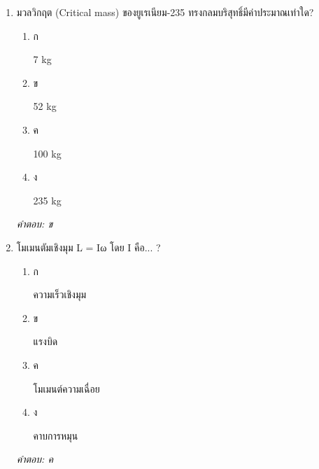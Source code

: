 \documentclass[12pt]{article}
\begin{document}
\begin{enumerate}[label=\arabic*., itemsep=0.5\baselineskip, topsep=0.5\baselineskip, leftmargin=*]
\item มวลวิกฤต (Critical mass) ของยูเรเนียม-235 ทรงกลมบริสุทธิ์มีค่าประมาณเท่าใด?
\begin{enumerate}[label=\alph*)., itemsep=0.3\baselineskip, topsep=0.3\baselineskip]
\item ก\ 
\begin{minipage}[t]{0.9\linewidth}
\raggedright 7 kg
\end{minipage}
\item ข\ 
\begin{minipage}[t]{0.9\linewidth}
\raggedright 52 kg
\end{minipage}
\item ค\ 
\begin{minipage}[t]{0.9\linewidth}
\raggedright 100 kg
\end{minipage}
\item ง\ 
\begin{minipage}[t]{0.9\linewidth}
\raggedright 235 kg
\end{minipage}
\end{enumerate}
\vspace{-0.3\baselineskip}
\begin{small}
\textit{คำตอบ: ข}
\end{small}

\item โมเมนตัมเชิงมุม L = Iω โดย I คือ... ?
\begin{enumerate}[label=\alph*)., itemsep=0.3\baselineskip, topsep=0.3\baselineskip]
\item ก\ 
\begin{minipage}[t]{0.9\linewidth}
\raggedright ความเร็วเชิงมุม
\end{minipage}
\item ข\ 
\begin{minipage}[t]{0.9\linewidth}
\raggedright แรงบิด
\end{minipage}
\item ค\ 
\begin{minipage}[t]{0.9\linewidth}
\raggedright โมเมนต์ความเฉื่อย
\end{minipage}
\item ง\ 
\begin{minipage}[t]{0.9\linewidth}
\raggedright คาบการหมุน
\end{minipage}
\end{enumerate}
\vspace{-0.3\baselineskip}
\begin{small}
\textit{คำตอบ: ค}
\end{small}


\end{enumerate}
\end{document}
